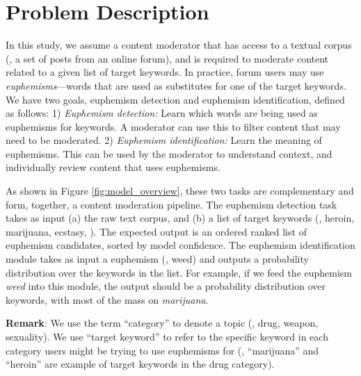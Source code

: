 

\section{Problem Description}
\label{sec:problem}


In this study, we assume a content moderator that has access to a textual corpus (\eg, a set of posts from an online forum), 
and is required to moderate content related to a given list of target keywords. 
In practice, forum users may use \emph{euphemisms}---words that are used as substitutes for  one of the target keywords. 
We have two goals, euphemism detection and euphemism identification, defined as follows: 
1) \emph{Euphemism detection:} Learn which words are being used as euphemisms for keywords. A moderator can use this to filter content that may need to be moderated.
2) \emph{Euphemism identification:} Learn the meaning of euphemisms. This can be used by the moderator to understand context, and individually review content that uses euphemisms. 

As shown in Figure \ref{fig:model_overview}, these two tasks are complementary and form, together, a content moderation pipeline.
The euphemism detection task takes as input (a) the raw text corpus, and (b) a list of target keywords (\eg, heroin, marijuana, ecstasy, \etc). 
The expected output is an ordered ranked list of euphemism candidates, sorted by model confidence. 
The euphemism identification module takes as input a euphemism (\eg, weed) and  outputs a probability distribution over the keywords in the list. 
For example, if we feed the euphemism \emph{weed} into this module, the output should be a probability distribution over keywords, with most of the mass on \emph{marijuana}.


\noindent \textbf{Remark}: 
We use the term ``category'' to denote a 
topic (\ie, drug, weapon, sexuality). 
We use ``target keyword'' to refer to the specific keyword in each category users might be trying to use euphemisms for (\eg, ``marijuana'' and ``heroin'' are example of target keywords in the drug category). 
